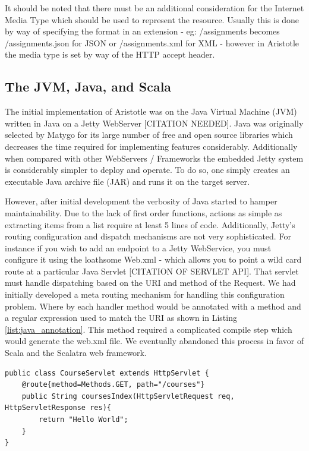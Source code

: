 \documentclass[a4paper,12pt,titlepage]{report}
\begin{document}
It should be noted that there must be an additional consideration for the Internet Media Type which should be used to represent the resource. 
Usually this is done by way of specifying the format in an extension - eg: /assignments becomes /assignments.json for JSON or /assignments.xml for XML - however in Aristotle the media type is set by way of the HTTP accept header.



\subsection{The JVM, Java, and Scala} %
\label{sub:jvm}

The initial implementation of Aristotle was on the Java Virtual Machine (JVM) written in Java on a Jetty WebServer [CITATION NEEDED]. 
Java was originally selected by Matygo for its large number of free and open source libraries which decreases the time required for implementing features considerably.
Additionally when compared with other WebServers / Frameworks the embedded Jetty system is considerably simpler to deploy and operate. 
To do so, one simply creates an executable Java archive file (JAR) and runs it on the target server.

However, after initial development the verbosity of Java started to hamper maintainability. Due to the lack of first order functions, actions as simple as extracting items from a list require at least 5 lines of code. 
Additionally, Jetty's routing configuration and dispatch mechanisms are not very sophisticated. 
For instance if you wish to add an endpoint to a Jetty WebService, you must configure it using the loathsome Web.xml - which allows you to point a wild card route at a particular Java Servlet [CITATION OF SERVLET API].
That servlet must handle dispatching based on the URI and method of the Request.
We had initially developed a meta routing mechanism for handling this configuration problem.
Where by each handler method would be annotated with a method and a regular expression used to match the URI as shown in Listing \ref{list:java_annotation}. 
This method required a complicated compile step which would generate the web.xml file. We eventually abandoned this process in favor of Scala and the Scalatra web framework.
\begin{lstlisting}[caption=Java Annotated Method Handler, label=list:java_annotation]
public class CourseServlet extends HttpServlet {
	@route{method=Methods.GET, path="/courses"}
	public String coursesIndex(HttpServletRequest req, HttpServletResponse res){
		return "Hello World";
	}
}
\end{lstlisting}
\end{document}
